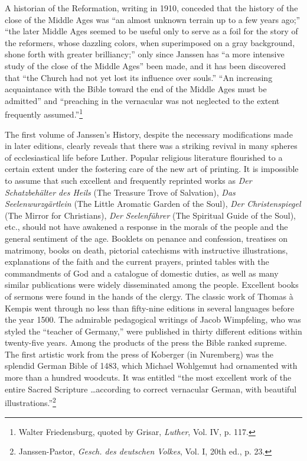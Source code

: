 A historian of the Reformation, writing in 1910, conceded that the
history of the close of the Middle Ages was “an almost unknown terrain
up to a few years ago;” “the later Middle Ages seemed to be useful only
to serve as a foil for the story of the reformers, whose dazzling colors,
when superimposed on a gray background, shone forth with greater brilliancy;”
only since Janssen has “a more intensive study of the close of the
Middle Ages” been made, and it has been discovered that “the Church had
not yet lost its influence over souls.” “An increasing acquaintance with the
Bible toward the end of the Middle Ages must be admitted” and “preaching
in the vernacular was not neglected to the extent frequently assumed.”\footnote
{Walter Friedensburg, quoted by Grisar, \textit{Luther}, Vol. IV, p. 117.}

The first volume of Janssen’s History, despite the necessary modifications
made in later editions, clearly reveals that there was a
striking revival in many spheres of ecclesiastical life before Luther.
Popular religious literature flourished to a certain extent under the
fostering care of the new art of printing. It is impossible to assume
that such excellent and frequently reprinted works as \textit{Der Schatzbehälter
des Heils} (The Treasure Trove of Salvation), \textit{Das
Seelenwurzgärtlein} (The Little Aromatic Garden of the Soul), \textit{Der
Christenspiegel} (The Mirror for Christians), \textit{Der Seelenführer} (The
Spiritual Guide of the Soul), etc., should not have awakened a response
in the morals of the people and the general sentiment of the
age. Booklets on penance and confession, treatises on matrimony,
books on death, pictorial catechisms with instructive illustrations,
explanations of the faith and the current prayers, printed tables
with the commandments of God and a catalogue of domestic duties,
as well as many similar publications were widely disseminated among
the people. Excellent books of sermons were found in the hands of
the clergy. The classic work of Thomas à Kempis went through no
less than fifty-nine editions in several languages before the year
1500. The admirable pedagogical writings of Jacob Wimpfeling,
who was styled the “teacher of Germany,” were published in thirty
different editions within twenty-five years. Among the products of
the press the Bible ranked supreme. The first artistic work from the
press of Koberger (in Nuremberg) was the splendid German Bible
of 1483, which Michael Wohlgemut had ornamented with more than
a hundred woodcuts. It was entitled “the most excellent work of
the entire Sacred Scripture \dots according to correct vernacular German,
with beautiful illustrations.”\footnote
{Janssen-Pastor, \textit{Gesch. des deutschen Volkes}, Vol. I, 20th ed., p. 23.}

